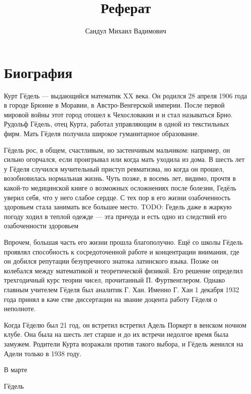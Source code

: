 \documentclass[specialist,
               substylefile = spbu.rtx,
               subf,href,colorlinks=true, 12pt]{disser}
\newcommand{\todo}[1]{ {\color{red} TODO: {#1}}}
\begin{document}

\title{
Реферат}


\author{ Сандул Михаил Вадимович }


\date{\number\year}

\maketitle

\chapter{Биография}

Курт Гёдель --- выдающийся математик XX века. Он родился 28 апреля 1906 года в городе Брюнне в Моравии, в Австро-Венгерской империи. После первой мировой войны этот город отошел к Чехословакии и и стал называться Брно. Рудольф Гёдель, отец Курта, работал управляющим в одной из текстильных фирм. Мать Гёделя получила широкое гуманитарное образование.\par

Гёдель рос, в общем, счастливым, но застенчивым мальчиком: например, он сильно огорчался, если проигрывал или когда мать уходила из дома. В шесть лет у Гёделя случился мучительный приступ ревматизма, но когда он прошел, возобновилась нормальная жизнь. Чуть позже, в восемь лет, видимо, прочтя в какой-то медицинской книге о возможных осложнениях после болезни, Гедёль уверил себя, что у него слабое сердце. С тех пор в его жизни озабоченность здоровьем стала занимать все большее место. \todo{Гедель даже в жаркую погоду ходил  в теплой одежде --- эта причуда и есть одно из следствий его озабоченности здоровьем}\par

Впрочем, большая часть его жизни прошла благополучно. Ещё со школы Гёдель проявлял способность к сосредоточенной работе и концентрации внимания, где он добился репутации безупречного знатока латинского языка. Позже он колебался между математикой и теоретической физикой. Его решение определил трехгодичный курс теории чисел, прочитанный П. Фуртвенглером. Однако главным учителем Гёделя был аналитик Г. Хан. Именно Г. Хан 1 декабря 1932 года принял в каче
стве диссертации на звание доцента работу Гёделя о неполноте.\par

Когда Гёделю был 21 год, он встретил встретил Адель Поркерт в венском ночном клубе. Она была на шесть лет старше и до их встречи недолгое время была замужем. Родители Курта возражали против такого выбора, и Гёдель женился на Адели только в 1938 году.\par



В марте 

Гёдель 
\end{document}
